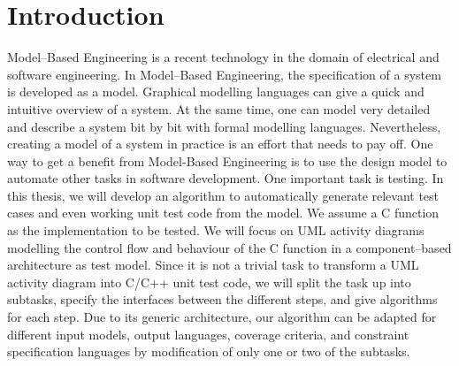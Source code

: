 \chapter{Introduction}
Model--Based Engineering is a recent technology in the domain of electrical and software engineering. In Model--Based Engineering, the specification of a system is developed as a model.
Graphical modelling languages can give a quick and intuitive overview of a system. At the same time, one can model very detailed and describe a system bit by bit with formal modelling languages.
Nevertheless, creating a model of a system in practice is an effort that needs to pay off.
One way to get a benefit from Model-Based Engineering is to use the design model to automate other tasks in software development. One important task is testing. 
In this thesis, we will develop an algorithm to automatically generate relevant test cases and even working unit test code from the model. We assume a C function as the implementation to be tested. We will focus on UML activity diagrams modelling the control flow and behaviour of the C function in a component--based architecture as test model. Since it is not a trivial task to transform a UML activity diagram into C/C++ unit test code, we will split the task up into subtasks, specify the interfaces between the different steps, and give algorithms for each step. Due to its generic architecture, our algorithm can be adapted for different input models, output languages, coverage criteria, and constraint specification languages by modification of only one or two of the subtasks.

